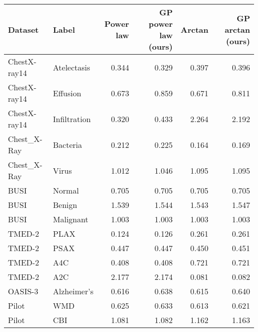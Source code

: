 \begin{tabular}{llrrrr}
\toprule
     Dataset &        Label &  Power law &  GP power law (ours) &  Arctan &  GP arctan (ours) \\
\midrule
ChestX-ray14 &  Atelectasis &      0.344 &                0.329 &   0.397 &             0.396 \\
ChestX-ray14 &     Effusion &      0.673 &                0.859 &   0.671 &             0.811 \\
ChestX-ray14 & Infiltration &      0.320 &                0.433 &   2.264 &             2.192 \\
 Chest\_X-Ray &     Bacteria &      0.212 &                0.225 &   0.164 &             0.169 \\
 Chest\_X-Ray &        Virus &      1.012 &                1.046 &   1.095 &             1.095 \\
        BUSI &       Normal &      0.705 &                0.705 &   0.705 &             0.705 \\
        BUSI &       Benign &      1.539 &                1.544 &   1.543 &             1.547 \\
        BUSI &    Malignant &      1.003 &                1.003 &   1.003 &             1.003 \\
      TMED-2 &         PLAX &      0.124 &                0.126 &   0.261 &             0.261 \\
      TMED-2 &         PSAX &      0.447 &                0.447 &   0.450 &             0.451 \\
      TMED-2 &          A4C &      0.408 &                0.408 &   0.721 &             0.721 \\
      TMED-2 &          A2C &      2.177 &                2.174 &   0.081 &             0.082 \\
     OASIS-3 &  Alzheimer’s &      0.616 &                0.638 &   0.615 &             0.640 \\
       Pilot &          WMD &      0.625 &                0.633 &   0.613 &             0.621 \\
       Pilot &          CBI &      1.081 &                1.082 &   1.162 &             1.163 \\
\bottomrule
\end{tabular}
